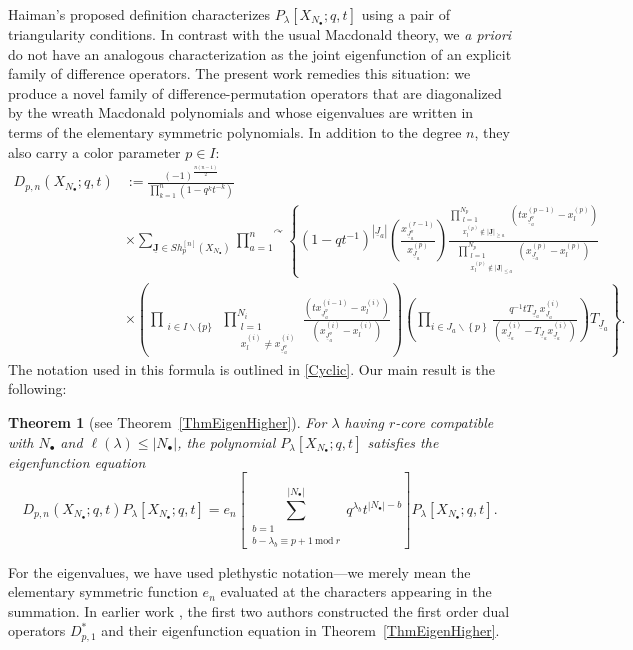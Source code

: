 \documentclass{amsart}
\newcommand{\Ju}{{\underline{J}}}
\newtheorem*{ithm}{Theorem}
\theoremstyle{remark}
\numberwithin{thm}{section}
\numberwithin{equation}{section}
\begin{document}
Haiman's proposed definition characterizes $P_\lambda[X_{N_\bullet};q,t]$ using a pair of triangularity conditions.
In contrast with the usual Macdonald theory, we \textit{a priori} do not have an analogous characterization as the joint eigenfunction of an explicit family of difference operators.
The present work remedies this situation: we produce a novel family of difference-permutation operators that are diagonalized by the wreath Macdonald polynomials and whose eigenvalues are written in terms of the elementary symmetric polynomials.
In addition to the degree $n$, they also carry a color parameter $p\in I$:
\begin{equation}
\begin{aligned}
D_{p,n}(X_{N_\bullet};q,t)&:=
\frac{(-1)^{\frac{n(n-1)}{2}}}{\prod_{k=1}^n(1-q^{k}t^{-k})}\\
&\times\sum_{\mathbf{\Ju}\in Sh_p^{[n]}(X_{N_\bullet})}
\overset{\curvearrowright}{\prod_{a=1}^n}
\left\{(1-qt^{-1})^{|\Ju_a|}\left(\frac{x^{(r-1)}_{\Ju_a^\triangledown}}{x^{(p)}_{\Ju_a}}\right)
\frac{\displaystyle
\prod_{\substack{l=1\\x^{(p)}_{l}\not\in|\mathbf{\Ju}|_{\ge a}}}^{N_p}\left( tx^{(p-1)}_{\Ju_a^\triangledown}-x^{(p)}_{l} \right)}
{\displaystyle
\prod_{\substack{l=1\\x^{(p)}_{l}\not\in|\mathbf{\Ju}|_{\le a}}}^{N_p}\left( x^{(p)}_{\Ju_a}-x^{(p)}_{l} \right)}\right.\\
&\times
\left.
\left( \prod_{\substack{i\in I\backslash\{p\}}}\, 
\prod_{\substack{l=1\\x^{(i)}_{l}\not=x^{(i)}_{\Ju_a^\triangledown}}}^{N_i}\frac{\left(tx^{(i-1)}_{\Ju_a^\triangledown}-x^{(i)}_{l}\right)}
{\left( x^{(i)}_{\Ju_a^\triangledown}-x^{(i)}_{l} \right)}
\right)
\left( \prod_{i\in J_a\backslash \left\{ p \right\}} 
\frac{q^{-1}t T_{\Ju_a}x^{(i)}_{\Ju_a}}
{\left( x^{(i)}_{\Ju_a}-T_{\Ju_a}x^{(i)}_{\Ju_a} \right)}
\right) T_{\Ju_a}\right\}.
\end{aligned}
\label{WreathMacOp}
\end{equation}
The notation used in this formula is outlined in \ref{Cyclic}. Our main result is the following:
\begin{ithm}[see Theorem~\ref{ThmEigenHigher}]
For $\lambda$ having $r$-core compatible with $N_\bullet$ and $\ell(\lambda)\le |N_\bullet|$, the polynomial $P_\lambda[X_{N_\bullet};q,t]$ satisfies the eigenfunction equation
\begin{equation}
D_{p,n}(X_{N_\bullet};q,t)P_\lambda[X_{N_\bullet};q,t]
=e_n\left[ \sum_{\substack{b=1\\ b-\lambda_b\equiv p+1\: \mathrm{mod} \: r}}^{|N_\bullet|}q^{\lambda_b}t^{|N_\bullet|-b} \right]
P_\lambda[X_{N_\bullet};q,t].
\label{WreathEigen}
\end{equation}
\end{ithm}
\noindent
For the eigenvalues, we have used plethystic notation---we merely mean the elementary symmetric function $e_n$ evaluated at the characters appearing in the summation.
In earlier work \cite{OS}, the first two authors constructed the first order dual operators $D_{p,1}^*$ and their eigenfunction equation in Theorem~\ref{ThmEigenHigher}.
\end{document}

